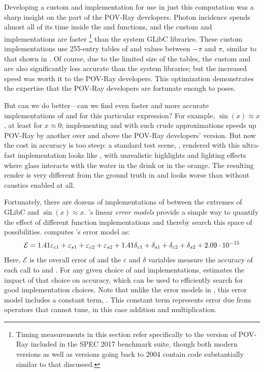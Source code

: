 \documentclass[paper.tex]{subfiles}
\begin{document}
Developing a custom  and  implementation
  for use in just this computation was a sharp insight
  on the part of the POV-Ray developers.
Photon incidence spends almost all of its time
  inside the  and  functions,
  and the custom  and  implementations
  are \nPovProgTableSpeedup faster%
\footnote{
Timing measurements in this section refer specifically to the version of POV-Ray
  included in the SPEC 2017 benchmark suite,
  though both modern versions as well as versions going back to 2004
  contain code substantially similar to that discussed.}
  than the system GLibC libraries.
These custom implementations use 255-entry tables
  of  and  values between $-\pi$ and $\pi$,
  similar to that shown in .
Of course, due to the limited size of the tables,
  the custom  and  are also
  significantly less accurate than the system libraries;
  but the increased speed was worth it
  to the POV-Ray developers.
This optimization demonstrates the expertise
  that the POV-Ray developers are fortunate enough to poses.

But can we do better---can we find
  even faster and more accurate implementations of  and 
  for this particular expression?
For example, $\sin(x) \approx x$, at least for $x \approx 0$;
  implementing  and  with such crude approximations
  speeds up POV-Ray by another \nPovRayConstSpeedup
  over and above the POV-Ray developers' version.
But now the cost in accuracy is too steep:
  a standard test scene, ,
  rendered with this ultra-fast  implementation
  looks like ,
  with unrealistic highlights and lighting effects
  where glass interacts with the water in the drink or in the orange.
The resulting render is
  very different from the ground truth in 
  and looks worse than without caustics enabled at all.

Fortunately, there are dozens of implementations of 
  between the extremes of GLibC and $\sin(x) \approx x$.
\name's linear \textit{error models} provide a simple way
  to quantify the effect of different function implementations
  and thereby search this space of possibilities.
\name computes 's error model as:
\begin{equation}\label{errmodel}
  \mathcal{E} =
  1.41 \varepsilon_{c1}
  + \varepsilon_{s1}
  + \varepsilon_{c2}
  + \varepsilon_{s2}
  + 1.41 \delta_{c1}
  + \delta_{s1}
  + \delta_{c2}
  + \delta_{s2}
  + 2.09 \cdot 10^{-15}
\end{equation}
Here, $\mathcal{E}$ is the overall error of 
  and the $\varepsilon$ and $\delta$ variables
  measure the accuracy of each call to  and .
For any given choice of  and  implementations,
   estimates the impact
  of that choice on accuracy, which can be used
  to efficiently search for good implementation choices.
Note that unlike the error models in ,
  this error model includes a constant term, .
This constant term represents error due from operators
  that \name cannot tune, in this case addition and multiplication.
\end{document}
